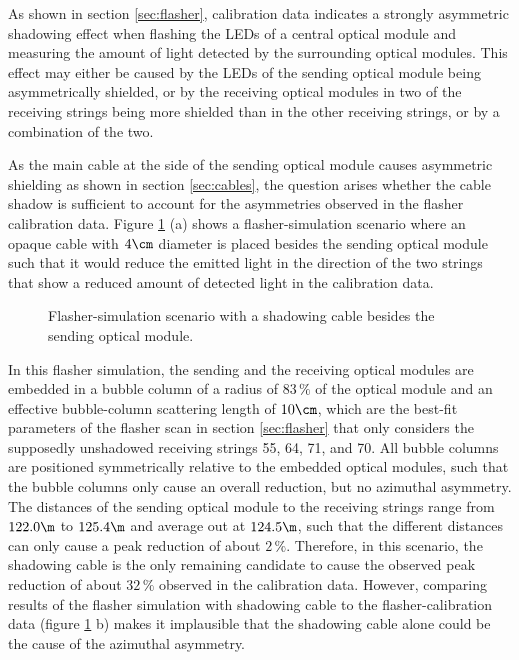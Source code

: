 As shown in section \ref{sec:flasher}, calibration data indicates a strongly asymmetric shadowing effect when flashing the LEDs of a central optical module and measuring the amount of light detected by the surrounding optical modules. This effect may either be caused by the LEDs of the sending optical module being asymmetrically shielded, or by the receiving optical modules in two of the receiving strings being more shielded than in the other receiving strings, or by a combination of the two.

As the main cable at the side of the sending optical module causes asymmetric shielding as shown in section \ref{sec:cables}, the question arises whether the cable shadow is sufficient to account for the asymmetries observed in the flasher calibration data. Figure \ref{fig:neen7Noo} (a) shows a flasher-simulation scenario where an opaque cable with $4\cm$ diameter is placed besides the sending optical module such that it would reduce the emitted light in the direction of the two strings that show a reduced amount of detected light in the calibration data.

\begin{figure}[htbp]
  \hfill
  \caption{Flasher-simulation scenario with a shadowing cable besides the sending optical module.}
  \label{fig:neen7Noo}
\end{figure}


In this flasher simulation, the sending and the receiving optical modules are embedded in a bubble column of a radius of $83\,\%$ of the optical module and an effective bubble-column scattering length of $10\cm$, which are the best-fit parameters of the flasher scan in section \ref{sec:flasher} that only considers the supposedly unshadowed receiving strings 55, 64, 71, and 70. All bubble columns are positioned symmetrically relative to the embedded optical modules, such that the bubble columns only cause an overall reduction, but no azimuthal asymmetry. The distances of the sending optical module to the receiving strings range from $122.0\m$ to $125.4\m$ and average out at $124.5\m$, such that the different distances can only cause a peak reduction of about $2\,\%$.
Therefore, in this scenario, the shadowing cable is the only remaining candidate to cause the observed peak reduction of about $32\,\%$ observed in the calibration data.
However, comparing results of the flasher simulation with shadowing cable to the flasher-calibration data (figure \ref{fig:neen7Noo} b) makes it implausible that the shadowing cable alone could be the cause of the azimuthal asymmetry.

